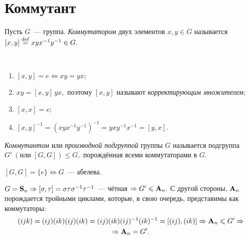 \newpage
        \section{Коммутант}
        \setcounter{definition}{0}
        \begin{definition}
            Пусть $G$~--- группа. \textit{Коммутатором} двух элементов ${x,y \in G}$ называется ${[x,y] \stackrel{\mathrm{def}}{=} xyx^{-1}y^{-1} \in G.}$
        \end{definition}
        \begin{remark}
        \
            \begin{enumerate}
            \setlength\itemsep{0.1em}
                \item $[x,y] = e \Leftrightarrow xy = yx;$
                \item ${xy = [x,y] \, yx,}$ поэтому $[x,y]$ называют \textit{корректирующим множителем};
                \item ${[x,x] = e;}$
                \item ${[x,y]^{-1} = (xyx^{-1}y^{-1})^{-1}=yxy^{-1}x^{-1}=[y,x].}$
            \end{enumerate}
        \end{remark}
        \begin{definition}
            \textit{Коммутантом} или \textit{производной подгруппой} группы $G$ называется подгруппа ${G' \ (\text{или }[G,G]) \leqslant G,}$ порождённая всеми коммутаторами в $G$.
        \end{definition}
        \begin{remark}
            ${[G,G] = \{e\} \Leftrightarrow G}$~--- абелева.
        \end{remark}
        \begin{exmpl*}
            ${G = \mathbf{S}_n \Rightarrow [\sigma, \tau] = \sigma \tau \sigma^{-1} \tau^{-1}}$~--- чётная ${\Rightarrow G' \leqslant \mathbf{A}_n.}$ С другой стороны, $\mathbf{A}_n$ порождается тройными циклами, которые, в свою очередь, представимы как коммутаторы:
            \begin{equation*}
		  \begin{gathered}
			(ijk) = (ij)(ik)(ij)(ik) = (ij)(ik)(ij)^{-1}(ik)^{-1} = [(ij), (ik)] \Rightarrow \mathbf{A}_n \leqslant G' \Rightarrow \\
			\Rightarrow \mathbf{A}_n = G'.
		  \end{gathered}
	       \end{equation*}
        \end{exmpl*}
